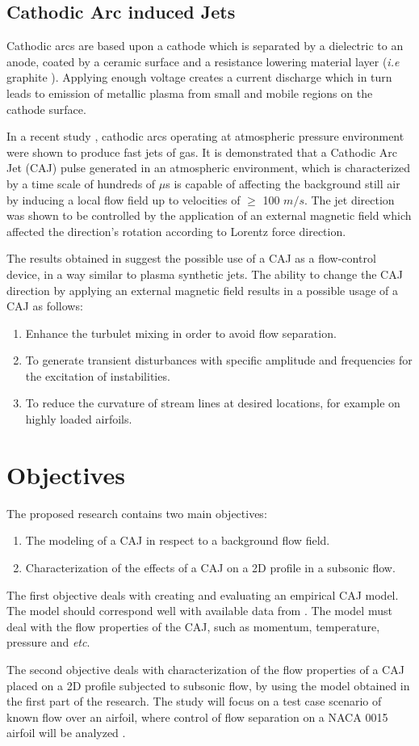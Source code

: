 \documentclass[10pt,a4paper]{article}
\begin{document}
\subsection{Cathodic Arc induced Jets}
Cathodic arcs are based upon a cathode which is separated by a dielectric to an anode, coated by a ceramic surface and a resistance lowering material layer (\textit{i.e} graphite \cite{KR}). Applying enough voltage creates a current discharge which in turn leads to emission of metallic plasma from small and mobile regions on the cathode surface. 
\par In a recent study \cite{KR}, cathodic arcs operating at atmospheric pressure environment were shown to produce fast jets of gas. It is demonstrated that a Cathodic Arc Jet (CAJ) pulse generated in an atmospheric environment, which is characterized by a time scale of hundreds of $\mu$s is capable of affecting the background still air by inducing a local flow field up to velocities of $\ge$ 100 $m/s$. The jet direction was shown to be controlled by the application of an external magnetic field which affected the direction's rotation according to Lorentz force direction. 
\par The results obtained in \cite{KR} suggest the possible use of a CAJ as a flow-control device, in a way similar to plasma synthetic jets. The ability to change the CAJ direction by applying an external magnetic field results in a possible usage of a CAJ as follows:
\begin{enumerate}
	\item Enhance the turbulet mixing in order to avoid flow separation.
	\item To generate transient disturbances with specific amplitude and frequencies for the excitation of instabilities. 
	\item To reduce the curvature of stream lines at desired locations, for example on highly loaded airfoils.
\end{enumerate} 
\section{Objectives}
The proposed research contains two main objectives:
\begin{enumerate}
    \item The modeling of a CAJ in respect to a background flow field.
    \item Characterization of the effects of a CAJ on a 2D profile in a subsonic flow.
\end{enumerate}
The first objective deals with creating and evaluating an empirical CAJ model. The model should correspond well with available data from \cite{KR}. The model must deal with the flow properties of the CAJ, such as momentum, temperature, pressure and \textit{etc}.
\par The second objective deals with characterization of the flow properties of a CAJ placed on a 2D profile subjected to subsonic flow, by using the model obtained in the first part of the research. The study will focus on a test case scenario of known flow over an airfoil, where control of flow separation on a \textsc{NACA 0015} airfoil will be analyzed  \cite{FLOWCTRL,KOK}.   
\end{document}
